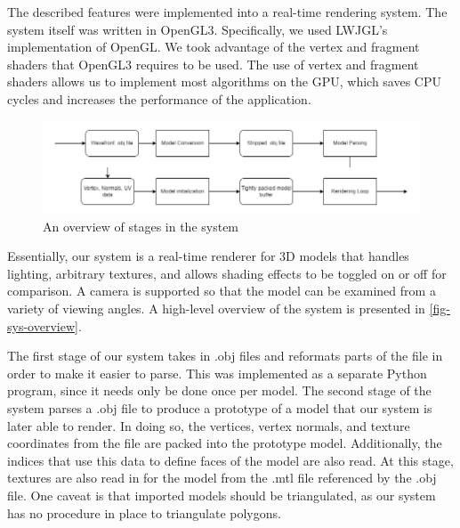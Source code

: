 \newpage 
The described features were implemented into a real-time rendering system. The system itself 
was written in OpenGL3. Specifically, we used LWJGL's implementation of OpenGL. We took advantage
of the vertex and fragment shaders that OpenGL3 requires to be used. The use of vertex and fragment
shaders allows us to implement most algorithms on the GPU, which saves CPU cycles and increases the
performance of the application.

\begin{figure}[h]
    \centering
    \includegraphics[width=\textwidth]{img/system-overview.png}
    \caption{An overview of stages in the system}
    \label{fig-sys-overview}
\end{figure}

Essentially, our system is a real-time renderer for 3D models that handles lighting, arbitrary
textures, and allows shading effects to be toggled on or off for comparison. A camera is supported
so that the model can be examined from a variety of viewing angles. A high-level overview of the
system is presented in \autoref{fig-sys-overview}.

The first stage of our system takes in .obj files and reformats parts of the file in order to make
it easier to parse. This was implemented as a separate Python program, since it needs only be done 
once per model.
The second stage of the system parses a .obj file to produce a prototype of a model that our system
is later able to render. In doing so, the vertices, vertex normals, and texture coordinates from the
file are packed into the prototype model. Additionally, the indices that use this data to define
faces of the model are also read. At this stage, textures are also read in for the model from the
.mtl file referenced by the  .obj file. One caveat is that imported models should be triangulated,
as our system has no procedure in place to triangulate polygons.

